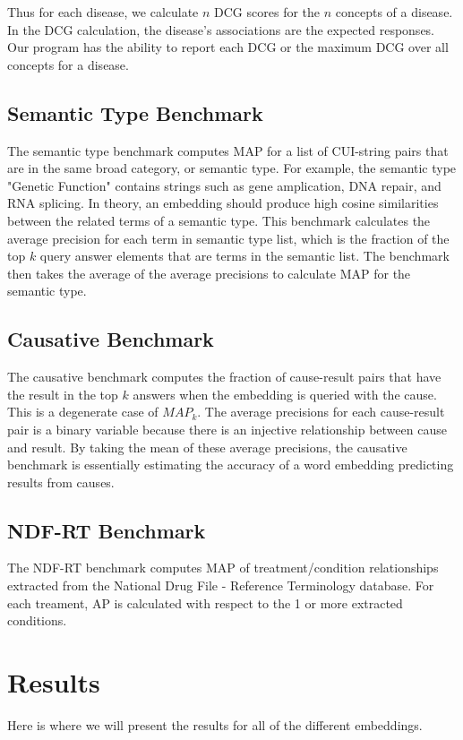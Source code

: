 \documentclass{ws-procs11x85}
\begin{document}
Thus for each disease, we calculate $n$ DCG scores for the $n$ concepts of a disease. In the DCG calculation, the disease's associations are the expected responses. Our program has the ability to report each DCG or the maximum DCG over all concepts for a disease. 

\subsection{Semantic Type Benchmark}
The semantic type benchmark computes MAP for a list of CUI-string pairs that are in the same broad category, or semantic type. For example, the semantic type "Genetic Function" contains strings such as gene amplication, DNA repair, and RNA splicing. In theory, an embedding should produce high cosine similarities between the related terms of a semantic type. This benchmark calculates the average precision for each term in semantic type list, which is the fraction of the top $k$ query answer elements that are terms in the semantic list. The benchmark then takes the average of the average precisions to calculate MAP for the semantic type. 

\subsection{Causative Benchmark}
The causative benchmark computes the fraction of cause-result pairs that have the result in the top $k$ answers when the embedding is queried with the cause. This is a degenerate case of $MAP_k$. The average precisions for each cause-result pair is a binary variable because there is an injective relationship between cause and result. By taking the mean of these average precisions, the causative benchmark is essentially estimating the accuracy of a word embedding predicting results from causes. 

\subsection{NDF-RT Benchmark}
The NDF-RT benchmark computes MAP of treatment/condition relationships extracted from the National Drug File - Reference Terminology database. For each treament, AP is calculated with respect to the 1 or more extracted conditions.

\section{Results}
Here is where we will present the results for all of the different embeddings.
\end{document}

